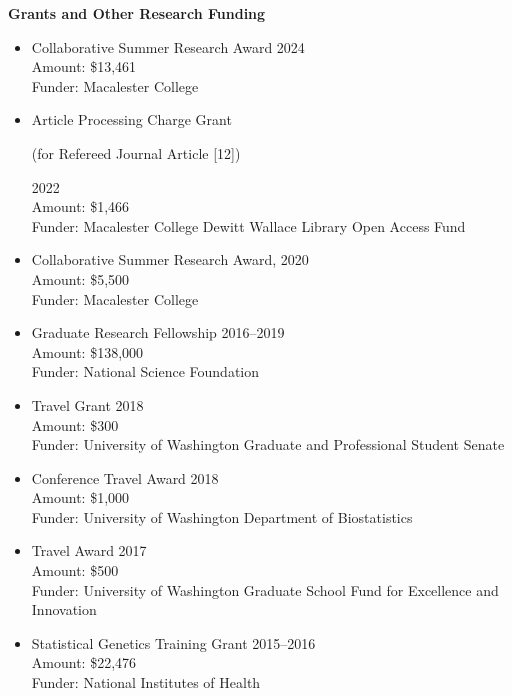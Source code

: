 \documentclass[margin]{res}
\begin{document}
\begin{resume}
\textbf{Grants and Other Research Funding}
\begin{itemize}
\item Collaborative Summer Research Award \hfill 2024 \\
Amount: \$13,461\\
Funder: Macalester College
\item Article Processing Charge Grant \begin{footnotesize}(for Refereed Journal Article [12])\end{footnotesize} \hfill 2022 \\ 
Amount: \$1,466 \\
Funder: Macalester College Dewitt Wallace Library Open Access Fund
\item Collaborative Summer Research Award,  \hfill 2020 \\ %
Amount:  \$5,500 \\
Funder: Macalester College
\item Graduate Research Fellowship \hfill 2016--2019 \\
Amount: \$138,000 \\
Funder: National Science Foundation  
\item Travel Grant  \hfill 2018 \\ 
Amount: \$300 \\
Funder: University of Washington Graduate and Professional Student Senate 
\item Conference Travel Award \hfill 2018 \\
Amount: \$1,000 \\
Funder: University of Washington Department of Biostatistics
\item Travel Award \hfill 2017 \\
Amount: \$500 \\
Funder: University of Washington Graduate School Fund for Excellence and Innovation 
\item Statistical Genetics Training Grant \hfill 2015--2016  \\
Amount: \$22,476 \\
Funder: National Institutes of Health %
\end{itemize}


\end{resume}
\end{document}
